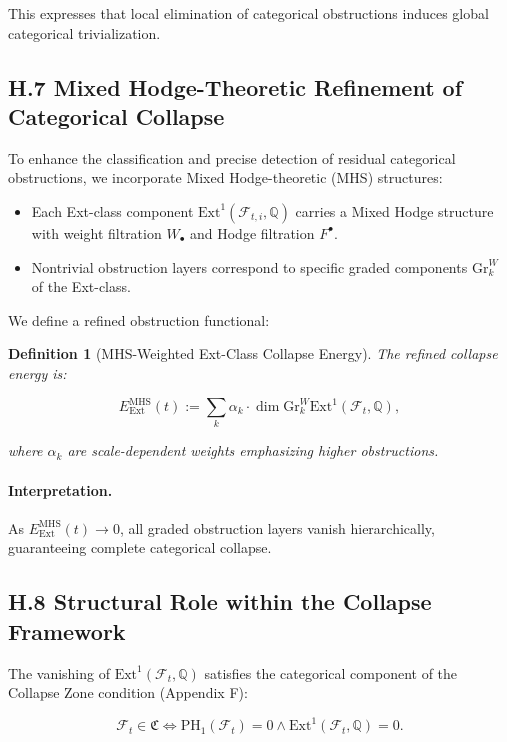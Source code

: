 \documentclass[11pt]{article}
\newtheorem{definition}[theorem]{Definition}
\begin{document}
This expresses that local elimination of categorical obstructions induces global categorical trivialization.

\subsection*{H.7 Mixed Hodge-Theoretic Refinement of Categorical Collapse}

To enhance the classification and precise detection of residual categorical obstructions, we incorporate Mixed Hodge-theoretic (MHS) structures:

\begin{itemize}
  \item Each Ext-class component \( \mathrm{Ext}^1(\mathcal{F}_{t, i}, \mathbb{Q}) \) carries a Mixed Hodge structure with weight filtration \( W_\bullet \) and Hodge filtration \( F^\bullet \).
  \item Nontrivial obstruction layers correspond to specific graded components \( \mathrm{Gr}_k^W \) of the Ext-class.
\end{itemize}

We define a refined obstruction functional:

\begin{definition}[MHS-Weighted Ext-Class Collapse Energy]
The refined collapse energy is:

\[
E_{\mathrm{Ext}}^{\mathrm{MHS}}(t) := \sum_{k} \alpha_k \cdot \dim \mathrm{Gr}_k^W \mathrm{Ext}^1(\mathcal{F}_t, \mathbb{Q}),
\]

where \( \alpha_k \) are scale-dependent weights emphasizing higher obstructions.
\end{definition}

\paragraph{Interpretation.}  
As \( E_{\mathrm{Ext}}^{\mathrm{MHS}}(t) \to 0 \), all graded obstruction layers vanish hierarchically, guaranteeing complete categorical collapse.

\subsection*{H.8 Structural Role within the Collapse Framework}

The vanishing of \( \mathrm{Ext}^1(\mathcal{F}_t, \mathbb{Q}) \) satisfies the categorical component of the Collapse Zone condition (Appendix F):

\[
\mathcal{F}_t \in \mathfrak{C} \iff \mathrm{PH}_1(\mathcal{F}_t) = 0 \land \mathrm{Ext}^1(\mathcal{F}_t, \mathbb{Q}) = 0.
\]
\end{document}
